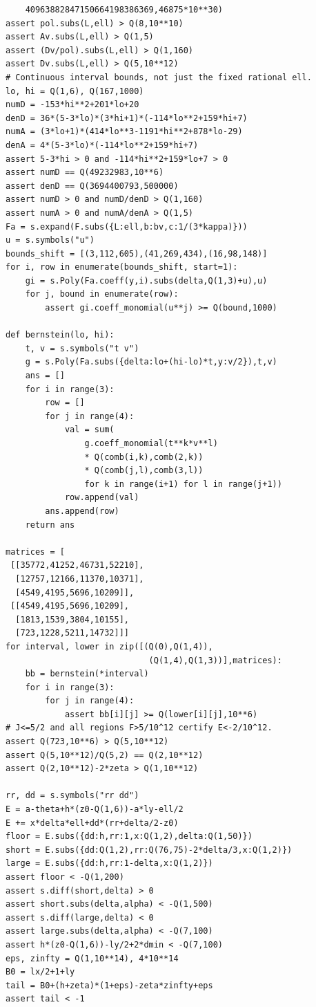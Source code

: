 \documentclass[12pt]{article}
\begin{document}
\begin{verbatim}
    40963882847150664198386369,46875*10**30)
assert pol.subs(L,ell) > Q(8,10**10)
assert Av.subs(L,ell) > Q(1,5)
assert (Dv/pol).subs(L,ell) > Q(1,160)
assert Dv.subs(L,ell) > Q(5,10**12)
# Continuous interval bounds, not just the fixed rational ell.
lo, hi = Q(1,6), Q(167,1000)
numD = -153*hi**2+201*lo+20
denD = 36*(5-3*lo)*(3*hi+1)*(-114*lo**2+159*hi+7)
numA = (3*lo+1)*(414*lo**3-1191*hi**2+878*lo-29)
denA = 4*(5-3*lo)*(-114*lo**2+159*hi+7)
assert 5-3*hi > 0 and -114*hi**2+159*lo+7 > 0
assert numD == Q(49232983,10**6)
assert denD == Q(3694400793,500000)
assert numD > 0 and numD/denD > Q(1,160)
assert numA > 0 and numA/denA > Q(1,5)
Fa = s.expand(F.subs({L:ell,b:bv,c:1/(3*kappa)}))
u = s.symbols("u")
bounds_shift = [(3,112,605),(41,269,434),(16,98,148)]
for i, row in enumerate(bounds_shift, start=1):
    gi = s.Poly(Fa.coeff(y,i).subs(delta,Q(1,3)+u),u)
    for j, bound in enumerate(row):
        assert gi.coeff_monomial(u**j) >= Q(bound,1000)

def bernstein(lo, hi):
    t, v = s.symbols("t v")
    g = s.Poly(Fa.subs({delta:lo+(hi-lo)*t,y:v/2}),t,v)
    ans = []
    for i in range(3):
        row = []
        for j in range(4):
            val = sum(
                g.coeff_monomial(t**k*v**l)
                * Q(comb(i,k),comb(2,k))
                * Q(comb(j,l),comb(3,l))
                for k in range(i+1) for l in range(j+1))
            row.append(val)
        ans.append(row)
    return ans

matrices = [
 [[35772,41252,46731,52210],
  [12757,12166,11370,10371],
  [4549,4195,5696,10209]],
 [[4549,4195,5696,10209],
  [1813,1539,3804,10155],
  [723,1228,5211,14732]]]
for interval, lower in zip([(Q(0),Q(1,4)),
                             (Q(1,4),Q(1,3))],matrices):
    bb = bernstein(*interval)
    for i in range(3):
        for j in range(4):
            assert bb[i][j] >= Q(lower[i][j],10**6)
# J<=5/2 and all regions F>5/10^12 certify E<-2/10^12.
assert Q(723,10**6) > Q(5,10**12)
assert Q(5,10**12)/Q(5,2) == Q(2,10**12)
assert Q(2,10**12)-2*zeta > Q(1,10**12)

rr, dd = s.symbols("rr dd")
E = a-theta+h*(z0-Q(1,6))-a*ly-ell/2
E += x*delta*ell+dd*(rr+delta/2-z0)
floor = E.subs({dd:h,rr:1,x:Q(1,2),delta:Q(1,50)})
short = E.subs({dd:Q(1,2),rr:Q(76,75)-2*delta/3,x:Q(1,2)})
large = E.subs({dd:h,rr:1-delta,x:Q(1,2)})
assert floor < -Q(1,200)
assert s.diff(short,delta) > 0
assert short.subs(delta,alpha) < -Q(1,500)
assert s.diff(large,delta) < 0
assert large.subs(delta,alpha) < -Q(7,100)
assert h*(z0-Q(1,6))-ly/2+2*dmin < -Q(7,100)
eps, zinfty = Q(1,10**14), 4*10**14
B0 = lx/2+1+ly
tail = B0+(h+zeta)*(1+eps)-zeta*zinfty+eps
assert tail < -1


\end{verbatim}
\end{document}
